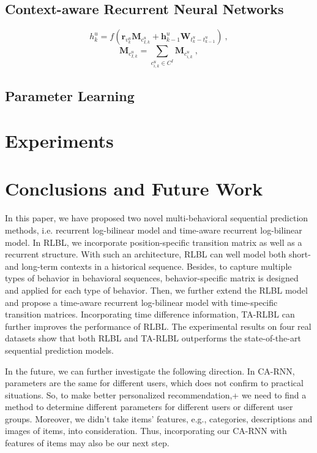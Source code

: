 \documentclass{sig-alternate}
\begin{document}
\subsection{ Context-aware Recurrent Neural Networks}
\begin{equation}
h_{k}^{u}=f\left ( \textbf{r}_{v_{k}^{u}}\textbf{M}_{c_{I,k}^{u}}+\textbf{h}_{k-1}^{u}\textbf{W}_{t_k^u-t_{k-1}^u} \right )
~,
\end{equation}
\begin{equation}
\textbf{M}_{c_{I,k}^{u}} = \sum_{c_{i,k}^{u}\in C^I} \textbf{M}_{c_{i,k}^{u}} 
~,
\end{equation}


\subsection{Parameter Learning}

\section{Experiments}

\section{Conclusions and Future Work}

In this paper, we have proposed two novel multi-behavioral sequential prediction methods, i.e. recurrent log-bilinear model and time-aware recurrent log-bilinear model. In RLBL, we incorporate position-specific transition matrix as well as a recurrent structure. With such an architecture, RLBL can well model both short- and long-term contexts in a historical sequence. Besides, to capture multiple types of behavior in behavioral sequences, behavior-specific matrix is designed and applied for each type of behavior. Then, we further extend the RLBL model and propose a time-aware recurrent log-bilinear model with time-specific transition matrices. Incorporating time difference information, TA-RLBL can further improves the performance of RLBL. The experimental results on four real datasets show that both RLBL and TA-RLBL outperforms the state-of-the-art sequential prediction models.

In the future, we can further investigate the following direction. In CA-RNN, parameters are the same for different users, which does not confirm to practical situations. So, to make better personalized recommendation,+ we need to find a method to determine different parameters for different users or different user groups. Moreover, we didn't take items' features, e.g., categories, descriptions and images of items, into consideration. Thus, incorporating our CA-RNN with features of items may also be our next step.

\small


\vspace{2cm}

\balancecolumns
\end{document}
